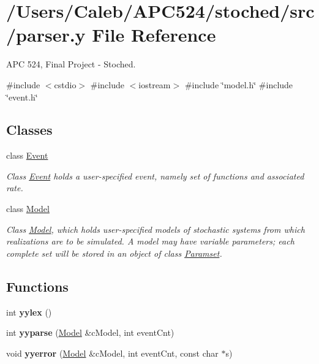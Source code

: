 \hypertarget{parser_8y}{}\section{/\+Users/\+Caleb/\+A\+P\+C524/stoched/src/parser.y File Reference}
\label{parser_8y}


A\+PC 524, Final Project -\/ Stoched.  


{\ttfamily \#include $<$cstdio$>$}\newline
{\ttfamily \#include $<$iostream$>$}\newline
{\ttfamily \#include \char`\"{}model.\+h\char`\"{}}\newline
{\ttfamily \#include \char`\"{}event.\+h\char`\"{}}\newline
\subsection*{Classes}
\begin{DoxyCompactItemize}
\item 
class \hyperlink{class_event}{Event}
\begin{DoxyCompactList}\small\item\em Class \hyperlink{class_event}{Event} holds a user-\/specified event, namely set of functions and associated rate. \end{DoxyCompactList}\item 
class \hyperlink{class_model}{Model}
\begin{DoxyCompactList}\small\item\em Class \hyperlink{class_model}{Model}, which holds user-\/specified models of stochastic systems from which realizations are to be simulated. A model may have variable parameters; each complete set will be stored in an object of class \hyperlink{class_paramset}{Paramset}. \end{DoxyCompactList}\end{DoxyCompactItemize}
\subsection*{Functions}
\begin{DoxyCompactItemize}
\item 
\mbox{\label{parser_8y_aa40b27ae32d6d1ae7160bd6256e08eb8}} 
int {\bfseries yylex} ()
\item 
\mbox{\label{parser_8y_adda17e02463cf0d5cecf9345ecbc3648}} 
int {\bfseries yyparse} (\hyperlink{class_model}{Model} \&c\+Model, int event\+Cnt)
\item 
\mbox{\label{parser_8y_a49ac4fdaad919cca7e66689491aeb58c}} 
void {\bfseries yyerror} (\hyperlink{class_model}{Model} \&c\+Model, int event\+Cnt, const char $\ast$s)
\end{DoxyCompactItemize}
